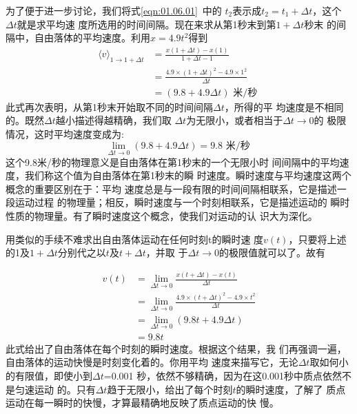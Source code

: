 \documentclass[../outline-of-mechanics.tex]{subfiles}
\begin{document}
为了便于进一步讨论，我们将式\ref{eqn:01.06.01}~中的
$t_2$表示成$t_2=t_1+\Delta t$，这个$\Delta t$就是求平均速
度所选用的时间间隔。现在来求从第1秒末到第$1+\Delta t$秒末
的间隔中，自由落体的平均速度。利用$x=4.9t^2$得到
\begin{equation*}
  \begin{aligned}
    \langle v\rangle_{1 \rightarrow 1+\Delta t} & =\frac{x\left(1+\Delta t\right)-x\left(1\right)}{1+\Delta t-1}           \\
                                                & =\frac{4.9 \times\left(1+\Delta t\right)^{2}-4.9 \times 1^{2}}{\Delta t} \\
                                                & =\left(9.8+4.9 \Delta t\right) \text { 米/秒 }
  \end{aligned}
\end{equation*}
此式再次表明，从第1秒末开始取不同的时间间隔$\Delta t$，所得的平
均速度是不相同的。既然$\Delta t$越小描述得越精确，我们取
$\Delta t$为无限小，或者相当于$\Delta t \rightarrow 0$的
极限情况，这时平均速度变成为:
\begin{equation*}
  \lim _{\Delta t \rightarrow 0}\left(9.8+4.9 \Delta t\right)=9.8 \text { 米/秒 }
\end{equation*}
这个9.8米/秒的物理意义是自由落体在第1秒末的一个无限小时
间间隔中的平均速度，我们称这个值为自由落体在第1秒末的瞬
时速度。瞬时速度与平均速度这两个概念的重要区别在于：平均
速度总是与一段有限的时间间隔相联系，它是描述一段运动过程
的物理量；相反，瞬时速度与一个时刻相联系，它是描述运动的
瞬时性质的物理量。有了瞬时速度这个概念，使我们对运动的认
识大为深化。

用类似的手续不难求出自由落体运动在任何时刻t的瞬时速
度$v\left(t\right)$，只要将上述的1及$1+\Delta t$分别代之以$t$及$t+\Delta t$，并取
于$\Delta t \rightarrow 0$的极限值就可以了。故有

\begin{equation}\label{eqn:01.06.02}
  \begin{aligned}
    v\left(t\right) & =\lim _{\Delta t \rightarrow 0} \frac{x\left(t+\Delta t\right)-x\left(t\right)}{\Delta t}               \\
                    & =\lim _{\Delta t \rightarrow 0} \frac{4.9 \times\left(t+\Delta t\right)^{2}-4.9 \times t^{2}}{\Delta t} \\
                    & =\lim _{\Delta t \rightarrow 0}\left(9.8 t+4.9 \Delta t\right)                                          \\
                    & =9.8 t
  \end{aligned}
\end{equation}
此式给出了自由落体在每个时刻的瞬时速度。根据这个结果，我
们再强调一遍，自由落体的运动快慢是时刻变化着的。你用平均
速度来描写它，无论$\Delta t$取如何小的有限值，即使小到$\Delta t$=0.001
秒，依然不够精确，因为在这0.001秒中质点依然不是匀速运动
的。只有$\Delta t$趋于无限小，给出了每个时刻$t$的瞬时速度，了解了
质点运动在每一瞬时的快慢，才算最精确地反映了质点运动的快
慢。
\end{document}

